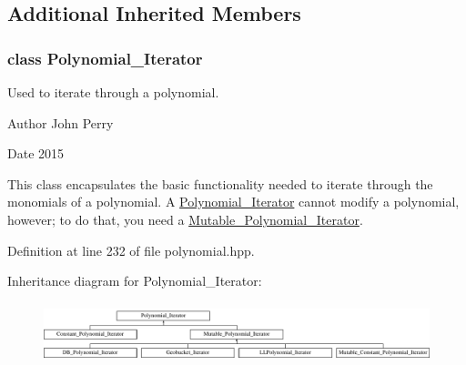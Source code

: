 \subsection*{Additional Inherited Members}
\label{class_polynomial___iterator}
\subsubsection{class Polynomial\+\_\+\+Iterator}
Used to iterate through a polynomial. 

\begin{DoxyAuthor}{Author}
John Perry 
\end{DoxyAuthor}
\begin{DoxyDate}{Date}
2015
\end{DoxyDate}
This class encapsulates the basic functionality needed to iterate through the monomials of a polynomial. A \hyperlink{group___iterator_group_class_polynomial___iterator}{Polynomial\+\_\+\+Iterator} cannot modify a polynomial, however; to do that, you need a \hyperlink{group___iterator_group_class_mutable___polynomial___iterator}{Mutable\+\_\+\+Polynomial\+\_\+\+Iterator}. 

Definition at line 232 of file polynomial.\+hpp.

Inheritance diagram for Polynomial\+\_\+\+Iterator\+:\begin{figure}[H]
\begin{center}
\leavevmode
\includegraphics[height=1.779661cm]{group___iterator_group}
\end{center}
\end{figure}
